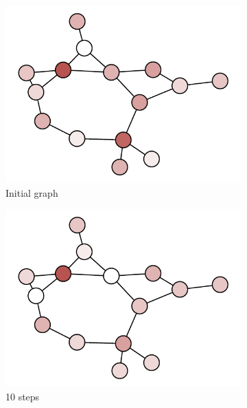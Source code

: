 \begin{figure}[t]
    \centering
    \begin{subfigure}[b]{0.24\textwidth}
    \includegraphics[width=\textwidth]{images/graph_diffusion_0}
    \caption{Initial graph}
    \end{subfigure}
    \begin{subfigure}[b]{0.24\textwidth}
    \includegraphics[width=\textwidth]{images/graph_diffusion_10}
    \caption{10 steps}
    \end{subfigure}
    \begin{subfigure}[b]{0.24\textwidth}

\end{subfigure}
\end{figure}
